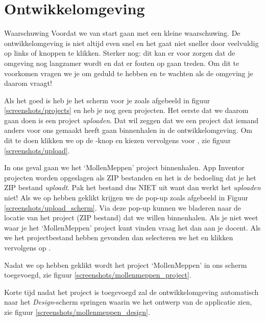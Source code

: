 \chapter{Ontwikkelomgeving}
\label{chap:ontwikkelomgeving}

\begin{derivation}{Waarschuwing}
Voordat we van start gaan met \ai een kleine waarschuwing. De ontwikkelomgeving is niet altijd even snel en het gaat niet sneller door veelvuldig op links of knoppen te klikken. Sterker nog: dit kan er voor zorgen dat de omgeving nog langzamer wordt en dat er fouten op gaan treden. Om dit te voorkomen vragen we je om geduld te hebben en te wachten als de omgeving je daarom vraagt!
\end{derivation}

Als het goed is heb je het scherm voor je zoals afgebeeld in figuur \ref{screenshots/projects} en heb je nog geen projecten. Het eerste dat we daarom gaan doen is een project \emph{uploaden}. Dat wil zeggen dat we een project dat iemand anders voor ons gemaakt heeft gaan binnenhalen in de  ontwikkelomgeving. Om dit te doen klikken we op de -knop en kiezen vervolgens voor , zie figuur \ref{screenshots/upload}.


In ons geval gaan we het `MollenMeppen' project binnenhalen. App Inventor projecten worden opgeslagen als ZIP bestanden en het is de bedoeling dat je het ZIP bestand \emph{uploadt}. Pak het bestand dus NIET uit want dan werkt het \emph{uploaden} niet! Als we op  hebben geklikt krijgen we de pop-up zoals afgebeeld in Figuur \ref{screenshots/upload_scherm}. Via deze pop-up kunnen we bladeren naar de locatie van het project (ZIP bestand) dat we willen binnenhalen. Als je niet weet waar je het `MollenMeppen' project kunt vinden vraag het dan aan je docent.
Als we het projectbestand hebben gevonden dan selecteren we het en klikken vervolgens op .
 
Nadat  we op  hebben geklikt wordt het project `MollenMeppen' in ons scherm toegevoegd, zie figuur \ref{screenshots/mollenmeppen_project}.


Korte tijd nadat het project is toegevoegd zal de ontwikkelomgeving automatisch naar het \emph{Design}-scherm springen waarin we het ontwerp van de applicatie zien, zie figuur \ref{screenshots/mollenmeppen_design}. 

